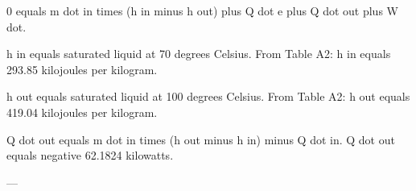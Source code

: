 0 equals m dot in times (h in minus h out) plus Q dot e plus Q dot out plus W dot.  

h in equals saturated liquid at 70 degrees Celsius.  
From Table A2: h in equals 293.85 kilojoules per kilogram.  

h out equals saturated liquid at 100 degrees Celsius.  
From Table A2: h out equals 419.04 kilojoules per kilogram.  

Q dot out equals m dot in times (h out minus h in) minus Q dot in.  
Q dot out equals negative 62.1824 kilowatts.  

---
